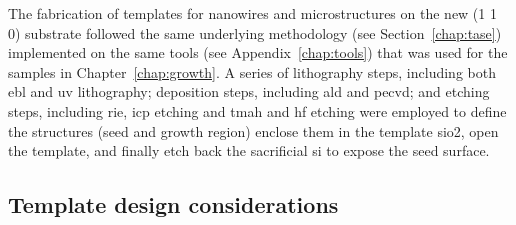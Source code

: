 The fabrication of templates for nanowires and microstructures on the new \hkl(1 1 0) substrate followed the same underlying methodology (see Section~\ref{chap:tase}) implemented on the same tools (see Appendix~\ref{chap:tools}) that was used for the samples in Chapter~\ref{chap:growth}. A series of lithography steps, including both \acf{ebl} and uv lithography; deposition steps, including \acf{ald} and \acf{pecvd}; and etching steps, including \acf{rie}, \acf{icp} etching and \acf{tmah} and \acf{hf} etching were employed to define the structures (seed and growth region) enclose them in the template \acs{sio2}, open the template, and finally etch back the sacrificial \acs{si} to expose the seed surface.

\subsection{Template design considerations}


